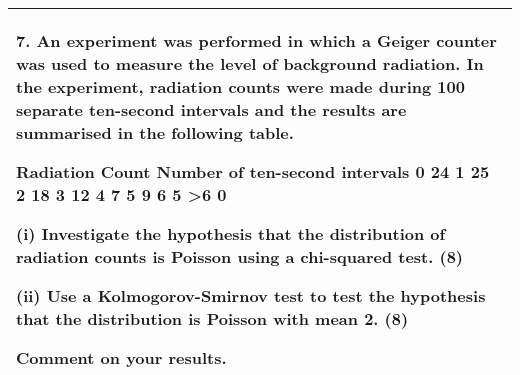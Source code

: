 \documentclass[a4paper,12pt]{article}
\begin{document}
\begin{table}[ht!]
     

\centering
     

\begin{tabular}{|p{15cm}|}
     

\hline 

 
7. An experiment was performed in which a Geiger counter was used to measure the level of background radiation.  In the experiment, radiation counts were made during 100 separate ten-second intervals and the results are summarised in the following table. 
 
Radiation Count Number of ten-second intervals 0 24 1 25 2 18 3 12 4 7 5 9 6 5 >6 0 
 
 
(i) Investigate the hypothesis that the distribution of radiation counts is Poisson using a chi-squared test. (8) 
 
(ii) Use a Kolmogorov-Smirnov test to test the hypothesis that the distribution is Poisson with mean 2. (8) 
 
Comment on your results. 

\\ \hline


\end{tabular}
    

\end{table}
\end{document}
